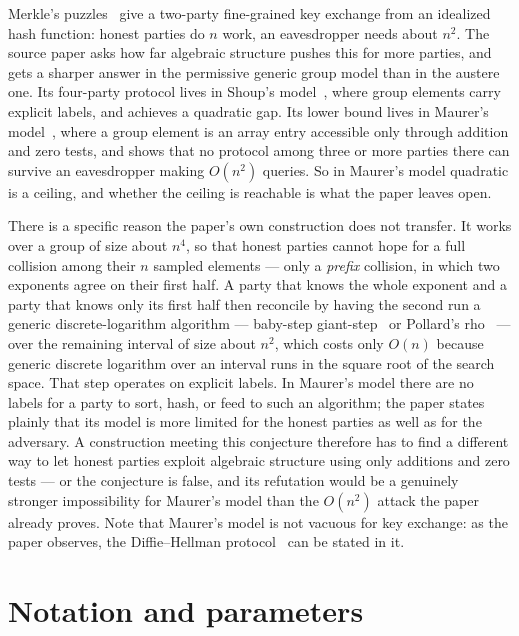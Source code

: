\documentclass{conjura-conjecture}
\begin{document}
Merkle's puzzles~\cite{Mer78} give a two-party fine-grained key exchange
from an idealized hash function: honest parties do $n$ work, an
eavesdropper needs about $n^{2}$. The source paper asks how far
algebraic structure pushes this for more parties, and gets a sharper
answer in the permissive generic group model than in the austere one.
Its four-party protocol lives in Shoup's model~\cite{Sho97}, where group
elements carry explicit labels, and achieves a quadratic gap. Its lower
bound lives in Maurer's model~\cite{Mau05}, where a group element is an
array entry accessible only through addition and zero tests, and shows
that no protocol among three or more parties there can survive an
eavesdropper making $O(n^{2})$ queries. So in Maurer's model quadratic
is a ceiling, and whether the ceiling is reachable is what the paper
leaves open.

There is a specific reason the paper's own construction does not
transfer. It works over a group of size about $n^{4}$, so that honest
parties cannot hope for a full collision among their $n$ sampled
elements --- only a \emph{prefix} collision, in which two exponents
agree on their first half. A party that knows the whole exponent and a
party that knows only its first half then reconcile by having the second
run a generic discrete-logarithm algorithm --- baby-step
giant-step~\cite{Sha71} or Pollard's rho~\cite{Pol75} --- over the
remaining
interval of size about $n^{2}$, which costs only $O(n)$ because generic
discrete logarithm over an interval runs in the square root of the
search space. That step operates on explicit labels. In Maurer's model
there are no labels for a party to sort, hash, or feed to such an
algorithm; the paper states plainly that its model is more limited for
the honest parties as well as for the adversary. A construction meeting
this conjecture therefore has to find a different way to let honest
parties exploit algebraic structure using only additions and zero tests
--- or the conjecture is false, and its refutation would be a genuinely
stronger impossibility for Maurer's model than the $O(n^{2})$ attack the
paper already proves. Note that Maurer's model is not vacuous for key
exchange: as the paper observes, the Diffie--Hellman
protocol~\cite{DH76} can be stated in it.

\section{Notation and parameters}\label{sec:notation}
\end{document}

